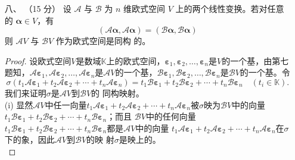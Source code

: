\begin{enumerate}[1~]
\begin{proof}
因为有限维空间之间的单射必是满射，所以\begin{align*}
&\text{$A$ 是可逆的，当且仅当$\mathscr{A}$是单射。}\\
&\Longleftrightarrow \text{$A$ 是可逆的，当且仅当$\mathscr{A}$是单射且$\mathscr{A}$是满射。}\\
&\Longleftrightarrow\text{$A$ 是可逆的，当且仅当$
\mathscr{A}$是可逆的线性变换。}
\end{align*}
这是显然的。
\end{proof}
\item[八、]（15 分）
设 $\mathscr{A}$ 与 $\mathscr{B}$ 为 $n$ 维欧式空间 $V$ 
上的两个线性变换。若对任意的 $\boldsymbol{\alpha} \in V$，有\[
( \mathscr { A } \boldsymbol{\alpha} , \mathscr { A } \boldsymbol{\alpha} ) = ( 
\mathscr { B } \boldsymbol{\alpha} , \mathscr { B } \boldsymbol{\alpha} )
\]
则 $\mathscr{A} V$ 与 $\mathscr{B}V$ 作为欧式空间是同构
的。
\begin{proof}
设欧式空间$V$是数域$\mathbb{K}$上的欧式空间，$
\boldsymbol{\varepsilon}_1, \boldsymbol{\varepsilon}_2, \dots, \boldsymbol{\varepsilon}_n$是$V
$的一个基，由第七题知，$\mathscr{A}\boldsymbol{\varepsilon}_1, 
\mathscr{A}\boldsymbol{\varepsilon}_2, \dots, \mathscr{A}
\boldsymbol{\varepsilon}_n$是$\mathscr{A}V$的一个基，$\mathscr{B}
\boldsymbol{\varepsilon}_1, \mathscr{B}\boldsymbol{\varepsilon}_2, \dots, 
\mathscr{B}\boldsymbol{\varepsilon}_n$是$\mathscr{B}V$的一个基。令
\[
\sigma(t_1\mathscr{A}\boldsymbol{\varepsilon}_1+t_2\mathscr{A}
\boldsymbol{\varepsilon}_2+\cdots+t_n\mathscr{A}
\boldsymbol{\varepsilon}_n)=t_1\mathscr{B}
\boldsymbol{\varepsilon}_1+t_2\mathscr{B}\boldsymbol{\varepsilon}_2+\cdots+t_n
\mathscr{B}\boldsymbol{\varepsilon}_n\quad(t_i\in \mathbb{K}).
\]
我们来证明$\sigma$是$\mathscr{A}V$到$\mathscr{B}V$的
同构映射。\\
(i) 显然$\mathscr{A}V$中任一向量$t_1\mathscr{A}
\boldsymbol{\varepsilon}_1+t_2\mathscr{A}\boldsymbol{\varepsilon}_2+\cdots+t_n
\mathscr{A}\boldsymbol{\varepsilon}_n$被$\sigma$映为$\mathscr{B}V
$中的向量$t_1\mathscr{B}\boldsymbol{\varepsilon}_1+t_2\mathscr{B}
\boldsymbol{\varepsilon}_2+\cdots+t_n\mathscr{B}\boldsymbol{\varepsilon}_n$；而且
$\mathscr{B}V$中的任何向量$t_1\mathscr{B}
\boldsymbol{\varepsilon}_1+t_2\mathscr{B}\boldsymbol{\varepsilon}_2+\cdots+t_n
\mathscr{B}\boldsymbol{\varepsilon}_n $都是$\mathscr{A}V$中的向量
$t_1\mathscr{A}\boldsymbol{\varepsilon}_1+t_2\mathscr{A}
\boldsymbol{\varepsilon}_2+\cdots+t_n\mathscr{A}\boldsymbol{\varepsilon}_n$在$
\sigma$下的象，因此$\mathscr{A}V$到$\mathscr{B}V$的映
射$\sigma$是映上的。\\

\end{proof}
\end{enumerate}
